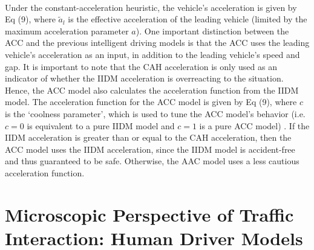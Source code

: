 \documentclass[12pt]{article}
\begin{document}
\paragraph{}
Under the constant-acceleration heuristic, the vehicle's acceleration is given by Eq (9), where $\tilde{a}_l$ is the effective acceleration of the leading vehicle (limited by the maximum acceleration parameter $a$). One important distinction between the ACC and the previous intelligent driving models is that the ACC uses the leading vehicle's acceleration as an input, in addition to the leading vehicle's speed and gap. It is important to note that the CAH acceleration is only used as an indicator of whether the IIDM acceleration is overreacting to the situation.  Hence, the ACC model also calculates the acceleration function from the IIDM model.  The acceleration function for the ACC model is given by Eq (9), where $c$ is the `coolness parameter', which is used to tune the ACC model's behavior (i.e. $c=0$ is equivalent to a pure IIDM model and $c=1$ is a pure ACC model) \cite[chapter~11]{treiber_kesting_2013}.  If the IIDM acceleration is greater than or equal to the CAH acceleration, then the ACC model uses the IIDM acceleration, since the IIDM model is accident-free and thus guaranteed to be safe.  Otherwise, the AAC model uses a less cautious acceleration function.
\section{Microscopic Perspective of Traffic Interaction: Human Driver Models}
\end{document}
